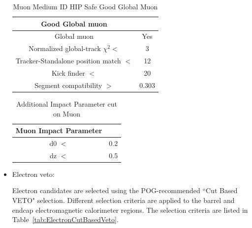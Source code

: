 \begin{itemize}
\begin{table}[htbp]
\fontsize{10 pt}{1.2 em}
\selectfont
\begin{centering}
\caption{\label{tab:MuonMediumIDGoodGlobalMuon} Muon Medium ID HIP Safe Good Global Muon}
\hspace*{-4ex}
\begin{lrbox}{\closureBox}
\begin{tabular}{|c|c|}
\hline
  Good Global muon                      &       \\
\hline
  Global muon                           & Yes   \\
\hline
  Normalized global-track $\chi^{2} <$  & 3     \\
\hline
  Tracker-Standalone position match $<$ & 12    \\
\hline
  Kick finder $<$                       & 20    \\
\hline
  Segment compatibility $>$             & 0.303 \\
\hline
\end{tabular}
\end{lrbox}
\scalebox{0.80}{\usebox{\closureBox}}
\par\end{centering}
\end{table}

\begin{table}[htbp]
\fontsize{10 pt}{1.2 em}
\selectfont
\begin{centering}
\caption{\label{tab:MuonMediumIDImpactParameter} Additional Impact Parameter cut on Muon }
\hspace*{-4ex}
\begin{lrbox}{\closureBox}
\begin{tabular}{|c|c|}
\hline
  Muon Impact Parameter &     \\
\hline
  d0 $<$                & 0.2 \\
\hline
  dz $<$                & 0.5 \\
\hline
\end{tabular}
\end{lrbox}
\scalebox{0.80}{\usebox{\closureBox}}
\par\end{centering}
\end{table}

\item Electron veto:

Electron candidates are selected using the POG-recommended ``Cut Based VETO" selection. Different selection criteria are applied to the barrel and endcap electromagnetic calorimeter regions. The selection criteria are listed in Table~\ref{tab:ElectronCutBasedVeto}. 


\end{itemize}
